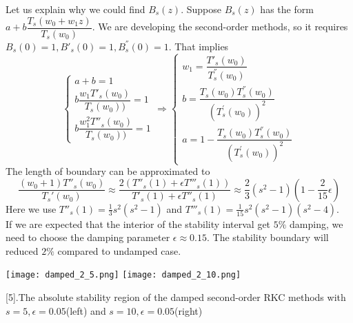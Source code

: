 \documentclass{article}
\theoremstyle{theorem}
\theoremstyle{definition}
\begin{document}
Let us explain why we could find $B_s(z)$. Suppose $B_s(z)$ has the form $a+b\dfrac{T_s(w_0+w_1z)}{T_s(w_0)}$. We are developing the second-order methods, so it requires $B_s(0)=1, B'_s(0)=1, B^{''}_s(0)=1$. That implies $$\left\{\begin{matrix}
a+b=1\\ 
b\dfrac{w_1T'_s(w_0)}{T_s(w_0))}=1\\ 
b\dfrac{w_1^2 T''_s(w_0)}{T_s(w_0))}=1
\end{matrix}\right. \Rightarrow  \left\{\begin{matrix}
w_1=\dfrac{T'_s(w_0)}{T^{''}_s(w_0)}\\ 
b=\dfrac{T_s(w_0)T^{''}_s(w_0)}{(T^{'}_s(w_0))^2}\\ 
a=1-\dfrac{T_s(w_0)T^{''}_s(w_0)}{(T^{'}_s(w_0))^2}
\end{matrix}\right.$$
The length of boundary can be approximated to $$\frac{(w_0+1)T''_s(w_0)}{T_s'(w_0)} \approx \frac{2 (T''_s(1)+\epsilon T'''_s(1))}{T'_s(1)+\epsilon T''_s(1)} \approx \frac{2}{3}(s^2-1)(1-\frac{2}{15} \epsilon)$$
Here we use $T''_s(1)=\frac{1}{3}s^2(s^2-1)$ and $T'''_s(1)=\frac{1}{15}s^2(s^2-1)(s^2-4)$.\\
If we are expected that the interior of the stability interval get $5\%$ damping, we need to choose the damping parameter $\epsilon \approx 0.15$. The stability boundary will reduced $2\%$ compared to undamped case.
	
	\texttt{[image: damped\_2\_5.png]}	
	\texttt{[image: damped\_2\_10.png]}
	\begin{center}
		\figurename[5]{.The absolute stability region of the damped second-order RKC methods with $s=5, \epsilon =0.05$(left) and $s=10, \epsilon=0.05$(right)}
	\end{center}
\end{document}
